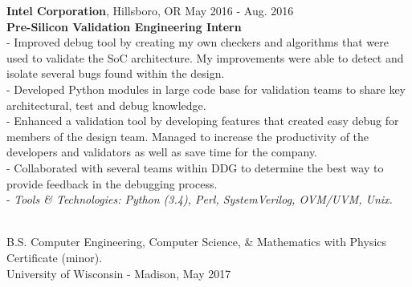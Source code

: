 \documentclass{resume}
\begin{document}
\begin{flushleft}
\textbf{Intel Corporation}, Hillsboro, OR \hfill May 2016 - Aug. 2016\\
\textbf{Pre-Silicon Validation Engineering Intern}\\
{\footnotesize
\ttab- Improved debug tool by creating my own checkers and algorithms that were used to validate the SoC architecture. My \ttab improvements were able to detect and isolate several bugs found within the design.\\
\ttab- Developed Python modules in large code base for validation teams to share key architectural, test and debug knowledge. \\
\ttab- Enhanced a validation tool by developing features that created easy debug for members of the design team. Managed to \ttab increase the productivity of the developers and validators as well as save time for the company. \\
\ttab- Collaborated with several teams within DDG to determine the best way to provide feedback in the debugging process. \\
\ttab- \textit{Tools \& Technologies: Python (3.4), Perl, SystemVerilog, OVM/UVM, Unix.}\\[3mm]
}


 \\
{\bigsize
	B.S. Computer Engineering, Computer Science, \& Mathematics with Physics Certificate (minor). \\
	University of Wisconsin - Madison, May 2017 } \\[5mm]


\end{flushleft}
\end{document}
